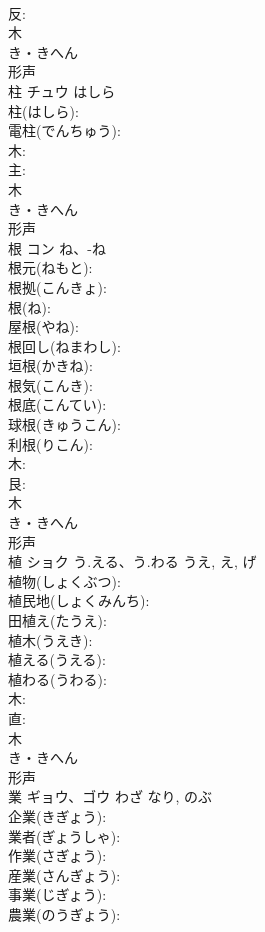 \documentclass[8pt]{extreport}
\begin{document}
\begin{CJK}{UTF8}{min}
\\	反: 
\\	木	
\\	き・きへん	
\\	形声 
\\	柱	チュウ	はしら		
\\	柱(はしら): 
\\	電柱(でんちゅう): 
\\	木: 
\\	主: 
\\	木	
\\	き・きへん	
\\	形声 
\\	根	コン	ね、-ね		
\\	根元(ねもと): 
\\	根拠(こんきょ): 
\\	根(ね): 
\\	屋根(やね): 
\\	根回し(ねまわし): 
\\	垣根(かきね): 
\\	根気(こんき): 
\\	根底(こんてい): 
\\	球根(きゅうこん): 
\\	利根(りこん): 
\\	木: 
\\	艮: 
\\	木	
\\	き・きへん	
\\	形声 
\\	植	ショク	う.える、う.わる	うえ, え, げ	
\\	植物(しょくぶつ): 
\\	植民地(しょくみんち): 
\\	田植え(たうえ): 
\\	植木(うえき): 
\\	植える(うえる): 
\\	植わる(うわる): 
\\	木: 
\\	直: 
\\	木	
\\	き・きへん	
\\	形声 
\\	業	ギョウ、ゴウ	わざ	なり, のぶ	
\\	企業(きぎょう): 
\\	業者(ぎょうしゃ): 
\\	作業(さぎょう): 
\\	産業(さんぎょう): 
\\	事業(じぎょう): 
\\	農業(のうぎょう): 

\end{CJK}
\end{document}
